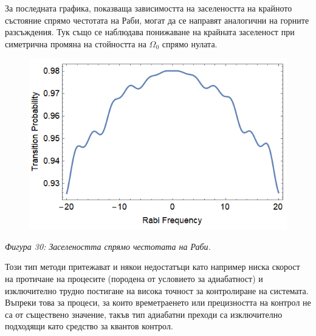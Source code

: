     За последната графика, показваща зависимостта на заселеността на крайното състояние спрямо честотата на Раби, могат да се направят аналогични на горните разсъждения. Тук също
    се наблюдава понижаване на крайната заселеност при симетрична промяна на стойността на $\Omega_0$ спрямо нулата.

    \begin{figure}[H]
        \centering
        \includegraphics[width=350pt]{28.png}
    \end{figure}
    \begin{center}
        \small \textit{Фигура 30: Заселеността спрямо честотата на Раби.}
    \end{center}

    Този тип методи притежават и някои недостатъци като например ниска скорост на протичане на процесите (породена от условието за адиабатност)
    и изключително трудно постигане на висока точност за контролиране на системата. Въпреки това за процеси, за които времетраенето или прецизността на контрол
    не са от съществено значение, такъв тип адиабатни преходи са изключително подходящи като средство за квантов контрол.